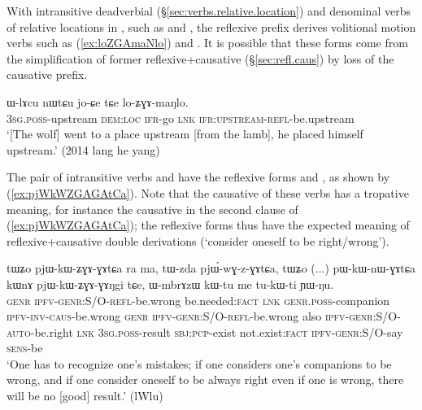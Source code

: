 With intransitive deadverbial (§\ref{sec:verbs.relative.location}) and denominal verbs of relative locations in , such as  and , the reflexive prefix derives  volitional motion verbs such as  (\ref{ex:loZGAmaNlo}) and . It is possible that these forms come from the simplification of former reflexive+causative (§\ref{sec:refl.caus}) by loss of the causative prefix.

\begin{exe}
\ex \label{ex:loZGAmaNlo}
\gll  ɯ-lɤcu nɯtɕu jo-ɕe tɕe lo-ʑɣɤ-maŋlo. \\
\textsc{3sg}.\textsc{poss}-upstream \textsc{dem}:\textsc{loc} \textsc{ifr}-go \textsc{lnk} \textsc{ifr}:\textsc{upstream}-\textsc{refl}-be.upstream \\
\glt `[The wolf] went to a place upstream [from the lamb], he placed himself upstream.' (2014 lang he yang)
\end{exe}

The pair of intransitive verbs  and  have the reflexive forms  and , as shown by (\ref{ex:pjWkWZGAGAtCa}). Note that the causative of these verbs has a tropative meaning, for  instance the causative  in the second clause of (\ref{ex:pjWkWZGAGAtCa}); the reflexive forms thus have the expected meaning of reflexive+causative double derivations (`consider oneself to be right/wrong').

\begin{exe}
\ex \label{ex:pjWkWZGAGAtCa}
\gll tɯʑo pjɯ-kɯ-ʑɣɤ-ɣɤtɕa ra ma, tɯ-zda pjɯ́-wɣ-z-ɣɤtɕa, tɯʑo %
(...) pɯ-kɯ-nɯ-ɣɤtɕa kɯnɤ pjɯ-kɯ-ʑɣɤ-ɣɤŋgi tɕe,  ɯ-mbrɤzɯ kɯ-tu me tu-kɯ-ti ɲɯ-ŋu. \\
\textsc{genr} \textsc{ipfv}-\textsc{genr}:S/O-\textsc{refl}-be.wrong be.needed:\textsc{fact} \textsc{lnk} \textsc{genr}.\textsc{poss}-companion \textsc{ipfv}-\textsc{inv}-\textsc{caus}-be.wrong \textsc{genr} {  } \textsc{ipfv}-\textsc{genr}:S/O-\textsc{refl}-be.wrong also  \textsc{ipfv}-\textsc{genr}:S/O-\textsc{auto}-be.right  \textsc{lnk} \textsc{3sg}.\textsc{poss}-result \textsc{sbj}:\textsc{pcp}-exist not.exist:\textsc{fact} \textsc{ipfv}-\textsc{genr}:S/O-say \textsc{sens}-be \\ 
\glt `One has to recognize one's mistakes; if one considers one's companions to be wrong, and if one consider oneself to be always right even if one is wrong, there will be no [good] result.' (lWlu)
\end{exe}


